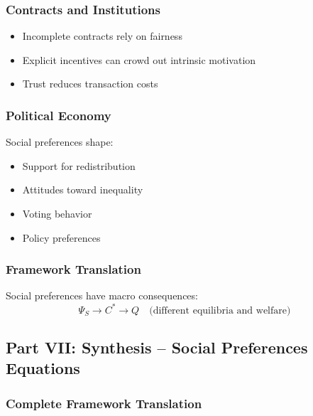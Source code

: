 \subsubsection{Contracts and Institutions}

\begin{itemize}
    \item Incomplete contracts rely on fairness
    \item Explicit incentives can crowd out intrinsic motivation
    \item Trust reduces transaction costs
\end{itemize}

\subsubsection{Political Economy}

Social preferences shape:
\begin{itemize}
    \item Support for redistribution
    \item Attitudes toward inequality
    \item Voting behavior
    \item Policy preferences
\end{itemize}

\subsubsection{Framework Translation}

Social preferences have macro consequences:
\begin{equation}
\Psi_S \to C^* \to Q \quad \text{(different equilibria and welfare)}
\end{equation}

\subsection{Part VII: Synthesis – Social Preferences Equations}

\subsubsection{Complete Framework Translation}


